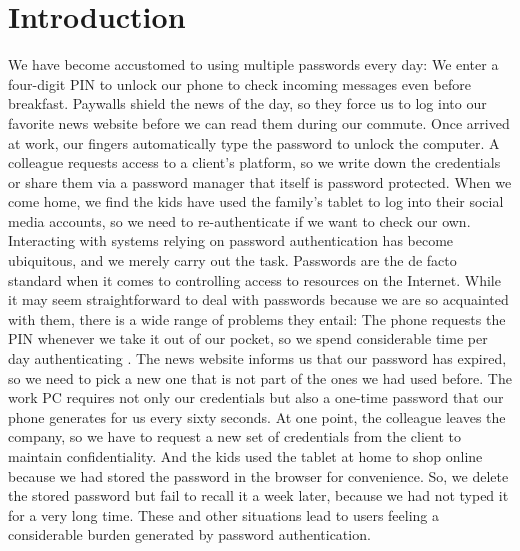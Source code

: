 \chapter[Introduction]{Introduction}\label{chap:intro}

We have become accustomed to using multiple passwords every day: We enter a four-digit PIN to unlock our phone to check incoming messages even before breakfast. Paywalls shield the news of the day, so they force us to log into our favorite news website before we can read them during our commute. Once arrived at work, our fingers automatically type the password to unlock the computer. A colleague requests access to a client's platform, so we write down the credentials or share them via a password manager that itself is password protected. When we come home, we find the kids have used the family's tablet to log into their social media accounts, so we need to re-authenticate if we want to check our own. Interacting with systems relying on password authentication has become ubiquitous, and we merely carry out the task. Passwords are the de facto standard when it comes to controlling access to resources on the Internet. While it may seem straightforward to deal with passwords because we are so acquainted with them, there is a wide range of problems they entail:
The phone requests the PIN whenever we take it out of our pocket, so we spend considerable time per day authenticating \cite{Harbach2016HardLockLife}. The news website informs us that our password has expired, so we need to pick a new one that is not part of the ones we had used before. The work PC requires not only our credentials but also a one-time password that our phone generates for us every sixty seconds. At one point, the colleague leaves the company, so we have to request a new set of credentials from the client to maintain confidentiality. And the kids used the tablet at home to shop online because we had stored the password in the browser for convenience. So, we delete the stored password but fail to recall it a week later, because we had not typed it for a very long time. These and other situations lead to users feeling a considerable burden generated by password authentication. 


